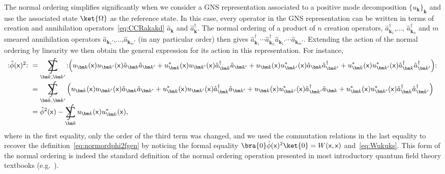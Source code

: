 \documentclass[letterpaper,12pt,titlepage,oneside,final]{book}
\newcommand{\normord}[1]{\vcentcolon\mathrel{#1}\vcentcolon}
\providecommand{\vcentcolon}{\mathrel{\mathop{:}}}
\newcommand{\mf}{\mathsf}%
\DeclareMathOperator*{\sumint}{%
\mathchoice%
  {\ooalign{$\displaystyle\sum$\cr\hidewidth$\displaystyle\int$\hidewidth\cr}}
  {\ooalign{\raisebox{.14\height}{\scalebox{.7}{$\textstyle\sum$}}\cr\hidewidth$\textstyle\int$\hidewidth\cr}}
  {\ooalign{\raisebox{.2\height}{\scalebox{.6}{$\scriptstyle\sum$}}\cr$\scriptstyle\int$\cr}}
  {\ooalign{\raisebox{.2\height}{\scalebox{.6}{$\scriptstyle\sum$}}\cr$\scriptstyle\int$\cr}}
}
\begin{document}
The normal ordering simplifies significantly when we consider a GNS representation associated to a positive mode decomposition $\{u_{\bm k}\}_{\bm k}$ and use the associated state $\ket{\Omega}$ as the reference state. In this case, every operator in the GNS representation can be written in terms of creation and annihilation operators~\eqref{eq:CCRakakd} $\hat{a}_{\bm k}$ and $\hat{a}^\dagger_{\bm k}$. The normal ordering of a product of $n$ creation operators, $\hat{a}^\dagger_{\bm k_1}$,..., $\hat{a}^\dagger_{\bm k_n}$ and $m$ smeared annihilation operators $\hat{a}_{\bm k_1'}$,...,$\hat{a}_{\bm k_m'}$ (in any particular order) then gives $\hat{a}^\dagger_{\bm k_1}\cdots\hat{a}^\dagger_{\bm k_n}\hat{a}_{\bm k_1'}\cdots\hat{a}_{\bm k_m'}$. Extending the action of the normal ordering by linearity we then obtain the general expression for its action in this representation. For instance,
\begin{align}
    \normord{\hat{\phi}(\mf x)^2} \,\,&= \sumint_{\bm k, \bm k'} \!\normord{\left(u_{\bm k}(\mf x)u_{\bm k'}(\mf x)\hat{a}_{\bm k} \hat{a}_{\bm k'} + u_{\bm k}^*(\mf x)u_{\bm k'}(\mf x)\hat{a}^\dagger_{\bm k} \hat{a}_{\bm k'}+ u_{\bm k}(\mf x)u_{\bm k'}^*(\mf x)\hat{a}_{\bm k} \hat{a}^\dagger_{\bm k'}+u_{\bm k}^*(\mf x)u_{\bm k'}^*(\mf x)\hat{a}^\dagger_{\bm k} \hat{a}^\dagger_{\bm k'}\right)}\nonumber\\
    &= \sumint_{\bm k, \bm k'} \left(u_{\bm k}(\mf x)u_{\bm k'}(\mf x)\hat{a}_{\bm k} \hat{a}_{\bm k'} + u_{\bm k}^*(\mf x)u_{\bm k'}(\mf x)\hat{a}^\dagger_{\bm k} \hat{a}_{\bm k'}+ u_{\bm k}(\mf x)u_{\bm k'}^*(\mf x)\hat{a}^\dagger_{\bm k'}\hat{a}_{\bm k} +u_{\bm k}^*(\mf x)u_{\bm k'}^*(\mf x)\hat{a}^\dagger_{\bm k} \hat{a}^\dagger_{\bm k'}\right)\nonumber\\
    &= \hat{\phi}^2(\mf x) - \sumint_{\bm k} u_{\bm k}(\mf x)u_{\bm k}^*(\mf x),
\end{align}
where in the first equality, only the order of the third term was changed, and we used the commutation relations in the last equality to recover the definition~\eqref{eq:normordphi2fgen} by noticing the formal equality $\bra{0}\hat{\phi}(\mf x)^2\ket{0} = W(\mf x, \mf x)$ and~\eqref{eq:Wukuks}. This form of the normal ordering is indeed the standard definition of the normal ordering operation presented in most introductory quantum field theory textbooks (e.g.~\cite{Peskin}).
\end{document}
